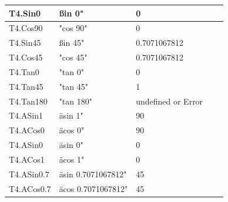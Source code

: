 \documentclass[a4paper, oneside, 11pt]{report}
\begin{document}
\begin{table}
\begin{tabular}{|p{1.5in}|p{1.5in}|p{1.6in}|p{1.6in}|p{2.4in}|}
\hline
T4.Sin0         & ßin 0"                    & 0                                      &                                         \\ 
\hline
T4.Cos90        & "cos 90"                  & 0                                      &                                         \\ 
\hline
T4.Sin45        & ßin 45"                   & 0.7071067812                           &                                         \\ 
\hline
T4.Cos45        & "cos 45"                  & 0.7071067812                           &                                         \\ 
\hline
T4.Tan0         & "tan 0"                   & 0                                      &                                         \\ 
\hline
T4.Tan45        & "tan 45"                  & 1                                      &                                         \\ 
\hline
T4.Tan180       & "tan 180"                 & undefined or Error                     &                                         \\ 
\hline
T4.ASin1        & äsin 1"                   & 90                                     &                                         \\ 
\hline
T4.ACos0        & äcos 0"                   & 90                                     &                                         \\ 
\hline
T4.ASin0        & äsin 0"                   & 0                                      &                                         \\ 
\hline
T4.ACos1        & äcos 1"                   & 0                                      &                                         \\ 
\hline
T4.ASin0.7      & äsin 0.7071067812"        & 45                                     &                                         \\ 
\hline
T4.ACos0.7      & äcos 0.7071067812"        & 45                                     &                                         \\ 
\hline
\end{tabular}
\end{table}
\end{document}
